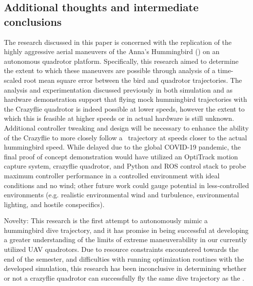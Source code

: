 \subsection{Additional thoughts and intermediate conclusions}
The research discussed in this paper is concerned with the replication of the highly aggressive aerial maneuvers of the Anna’s Hummingbird (\Calypteanna) on an autonomous quadrotor platform. Specifically, this research aimed to determine the extent to which these maneuvers are possible through analysis of a time-scaled root mean square error between the bird and quadrotor trajectories. The analysis and experimentation discussed previously in both simulation and as hardware demonstration support that flying mock hummingbird trajectories with the Crazyflie quadrotor is indeed possible at lower speeds, however the extent to which this is feasible at higher speeds or in actual hardware is still unknown. Additional controller tweaking and design will be necessary to enhance the ability of the Crazyflie to more closely follow a \Canna\ trajectory at speeds closer to the actual hummingbird speed. While delayed due to the global COVID-19 pandemic, the final proof of concept demonstration would have utilized an OptiTrack motion capture system, crazyflie quadrotor, and Python and ROS control stack to probe maximum controller performance in a controlled environment with ideal conditions and no wind; other future work could gauge potential in less-controlled environments (e.g. realistic environmental wind and turbulence, environmental lighting, and hostile conspecifics). 

Novelty: This research is the first attempt to autonomously mimic a hummingbird dive trajectory, and it has promise in being successful at developing a greater understanding of the limits of extreme maneuverability in our currently utilized UAV quadrotors. Due to resource constraints encountered towards the end of the semester, and difficulties with running optimization routines with the developed simulation, this research has been inconclusive in determining whether or not a crazyflie quadrotor can successfully fly the same dive trajectory as the \Canna. 







